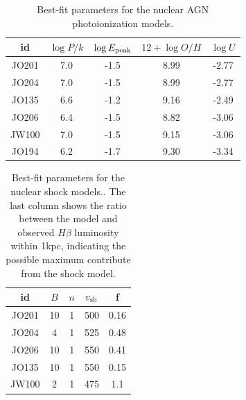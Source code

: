 \documentclass[fleqn,usenatbib]{mnras}
\begin{document}




\begin{table}
	\begin{tabular}{ccccc}
		\hline\hline
     id & $\log P/k$ & $\log E_{\rm peak}$ & $12 + \log O/H$ & $\log U$\\
\hline     
JO201 & 7.0 & -1.5  & 8.99 & -2.77\\
JO204 & 7.0 & -1.5 & 8.99 & -2.77 \\
JO135 & 6.6 &-1.2 & 9.16 & -2.49\\
JO206 & 6.4 & -1.5 & 8.82 & -3.06\\
JW100 & 7.0 & -1.5 & 9.15 & -3.06 \\
JO194 & 6.2 & -1.7 & 9.30 & -3.34\\
    \hline    
   \end{tabular} 
   \caption{Best-fit parameters for the nuclear AGN photoionization models.\label{tab:photmodels} }
\end{table}

\begin{table}
	\begin{tabular}{ccccc}
		\hline\hline
		id & $B$ & $n$ & $v_{\rm sh} $ & f\\
		\hline     
		JO201 & 10 & 1  & 500 & 0.16\\
		JO204 & 4 &  1 & 525 & 0.48 \\
		JO206 & 10 & 1  & 550 & 0.41\\
		JO135 & 10 & 1  & 550 & 0.15 \\
		JW100 & 2 & 1  & 475 & 1.1\\
		\hline    
	\end{tabular} 
	\caption{Best-fit parameters for the nuclear shock models.\label{tab:shmodels}. The last column shows the ratio between the model and observed $H\beta$ luminosity within 1kpc, indicating the possible maximum contribute from the shock model. }
\end{table}
\end{document}
